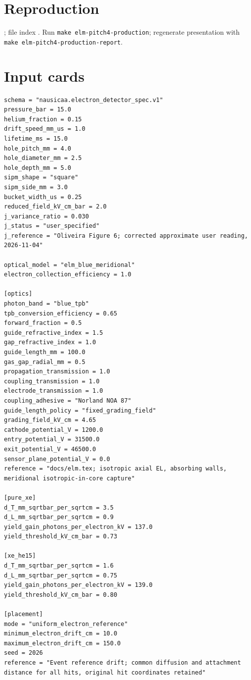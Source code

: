\documentclass[11pt,a4paper]{article}
\begin{document}
\section*{Reproduction}; file index . Run \texttt{make elm-pitch4-production}; regenerate presentation with \texttt{make elm-pitch4-production-report}.
\section*{Input cards}\begin{Verbatim}[breaklines,breakanywhere,fontsize=\footnotesize]
schema = "nausicaa.electron_detector_spec.v1"
pressure_bar = 15.0
helium_fraction = 0.15
drift_speed_mm_us = 1.0
lifetime_ms = 15.0
hole_pitch_mm = 4.0
hole_diameter_mm = 2.5
hole_depth_mm = 5.0
sipm_shape = "square"
sipm_side_mm = 3.0
bucket_width_us = 0.25
reduced_field_kV_cm_bar = 2.0
j_variance_ratio = 0.030
j_status = "user_specified"
j_reference = "Oliveira Figure 6; corrected approximate user reading, 2026-11-04"

optical_model = "elm_blue_meridional"
electron_collection_efficiency = 1.0

[optics]
photon_band = "blue_tpb"
tpb_conversion_efficiency = 0.65
forward_fraction = 0.5
guide_refractive_index = 1.5
gap_refractive_index = 1.0
guide_length_mm = 100.0
gas_gap_radial_mm = 0.5
propagation_transmission = 1.0
coupling_transmission = 1.0
electrode_transmission = 1.0
coupling_adhesive = "Norland NOA 87"
guide_length_policy = "fixed_grading_field"
grading_field_kV_cm = 4.65
cathode_potential_V = 1200.0
entry_potential_V = 31500.0
exit_potential_V = 46500.0
sensor_plane_potential_V = 0.0
reference = "docs/elm.tex; isotropic axial EL, absorbing walls, meridional isotropic-in-core capture"

[pure_xe]
d_T_mm_sqrtbar_per_sqrtcm = 3.5
d_L_mm_sqrtbar_per_sqrtcm = 0.9
yield_gain_photons_per_electron_kV = 137.0
yield_threshold_kV_cm_bar = 0.73

[xe_he15]
d_T_mm_sqrtbar_per_sqrtcm = 1.6
d_L_mm_sqrtbar_per_sqrtcm = 0.75
yield_gain_photons_per_electron_kV = 139.0
yield_threshold_kV_cm_bar = 0.80

[placement]
mode = "uniform_electron_reference"
minimum_electron_drift_cm = 10.0
maximum_electron_drift_cm = 150.0
seed = 2026
reference = "Event reference drift; common diffusion and attachment distance for all hits, original hit coordinates retained"


\end{Verbatim}
\end{document}
